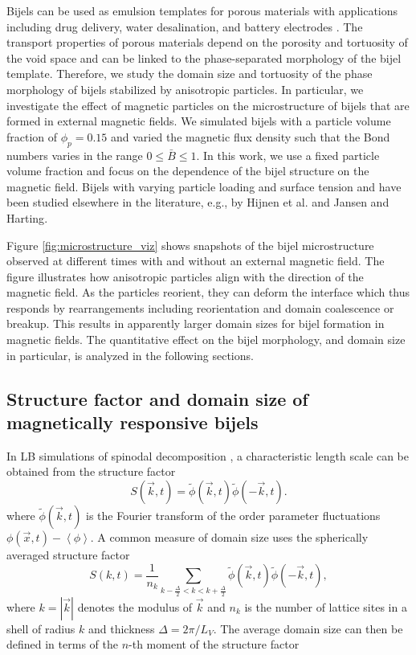 Bijels can be used as emulsion templates for porous materials with
applications including drug delivery, water desalination, and battery
electrodes
\cite{vanoli_bijels_2022, chen_pore-scale_2022, lu_controllable_2020, garcia_scalable_2019}.
The transport properties of porous materials depend on the porosity and
tortuosity of the void space and can be linked to the phase-separated
morphology of the bijel template. Therefore, we study the domain size
and tortuosity of the phase morphology of bijels stabilized by
anisotropic particles. In particular, we investigate the effect of
magnetic particles on the microstructure of bijels that are formed in
external magnetic fields. We simulated bijels with a particle volume
fraction of \(\phi_p=0.15\) and varied the magnetic flux density such
that the Bond numbers varies in the range \(0\le\bar{B}\le1\).
In this work, we use a fixed particle volume fraction and focus on the dependence of the bijel structure on the magnetic field. Bijels with varying particle loading and surface tension and have been studied elsewhere in the literature, e.g., by Hijnen et al.\cite{hijnen_bijels_2015} and Jansen and Harting\cite{jansen_bijels_2011}.

Figure \ref{fig:microstructure_viz} shows snapshots of the bijel
microstructure observed at different times with and without an external
magnetic field. The figure illustrates how anisotropic particles align
with the direction of the magnetic field. As the particles reorient,
they can deform the interface which thus responds by rearrangements
including reorientation and domain coalescence or breakup. This results
in apparently larger domain sizes for bijel formation in magnetic
fields. The quantitative effect on the bijel morphology, and domain size
in particular, is analyzed in the following sections.

\subsection{Structure factor and domain size of magnetically responsive bijels}

In LB simulations of spinodal decomposition
\cite{kendon_3d_1999,kendon_inertial_2001}, a characteristic length
scale can be obtained from the structure factor
%
\begin{equation}
S(\vec{k},t) = \tilde{\phi}(\vec{k},t)\tilde{\phi}(-\vec{k},t) .
\end{equation}
%
where \(\tilde{\phi}(\vec{k},t)\) is the Fourier
transform of the order parameter fluctuations
\(\phi(\vec{x},t)-\left\langle\phi\right\rangle\). A common measure of
domain size uses the spherically averaged structure factor
%
\begin{equation}
S(k,t) = \frac{1}{n_k} \sum_{k-\frac{\Delta}{2}<k<k+\frac{\Delta}{2}} \tilde{\phi}(\vec{k},t)\tilde{\phi}(-\vec{k},t) ,
\end{equation}
%
where \(k=|\vec{k}|\) denotes the modulus of \(\vec{k}\)
and \(n_k\) is the number of lattice sites in a shell of radius \(k\)
and thickness \(\Delta=2\pi/L_V\). The average domain size can then be
defined in terms of the \(n\)-th moment of the structure factor
\cite{laradji_molecular_1996}


